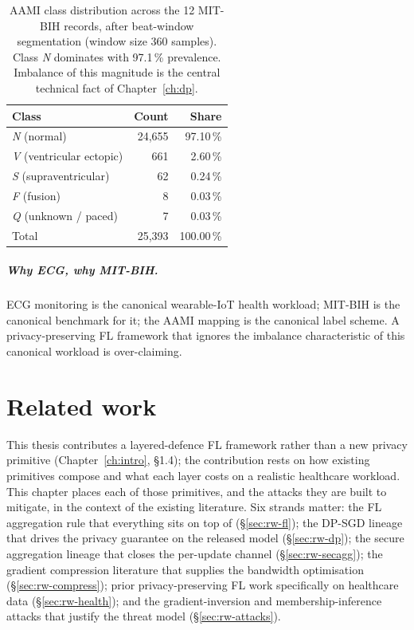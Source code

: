 \documentclass[11pt,a4paper]{report}
\begin{document}
\begin{table}[h]
  \centering
  \caption{AAMI class distribution across the 12 MIT-BIH records, after
  beat-window segmentation (window size 360 samples). Class \emph{N}
  dominates with 97.1\,\% prevalence. Imbalance of this magnitude is the
  central technical fact of Chapter~\ref{ch:dp}.}
  \label{tab:class-counts}
  \begin{tabular}{lrr}
    \toprule
    Class & Count & Share \\
    \midrule
    \emph{N} (normal)               & 24{,}655 & 97.10\,\% \\
    \emph{V} (ventricular ectopic)  &     661 &  2.60\,\% \\
    \emph{S} (supraventricular)     &      62 &  0.24\,\% \\
    \emph{F} (fusion)               &       8 &  0.03\,\% \\
    \emph{Q} (unknown / paced)      &       7 &  0.03\,\% \\
    \midrule
    Total                           & 25{,}393 & 100.00\,\% \\
    \bottomrule
  \end{tabular}
\end{table}

\paragraph{Why ECG, why MIT-BIH.}
ECG monitoring is the canonical wearable-IoT health workload; MIT-BIH is the
canonical benchmark for it; the AAMI mapping is the canonical label scheme.
A privacy-preserving FL framework that ignores the imbalance characteristic of
this canonical workload is over-claiming.

\chapter{Related work}\label{ch:related}

This thesis contributes a layered-defence FL framework rather than a new
privacy primitive (Chapter~\ref{ch:intro}, \S1.4); the contribution rests on
how existing primitives compose and what each layer costs on a realistic
healthcare workload. This chapter places each of those primitives, and the
attacks they are built to mitigate, in the context of the existing
literature. Six strands matter: the FL aggregation rule that everything
sits on top of (\S\ref{sec:rw-fl}); the DP-SGD lineage that drives the
privacy guarantee on the released model (\S\ref{sec:rw-dp}); the secure
aggregation lineage that closes the per-update channel
(\S\ref{sec:rw-secagg}); the gradient compression literature that supplies
the bandwidth optimisation (\S\ref{sec:rw-compress}); prior
privacy-preserving FL work specifically on healthcare data
(\S\ref{sec:rw-health}); and the gradient-inversion and
membership-inference attacks that justify the threat model
(\S\ref{sec:rw-attacks}).
\end{document}
